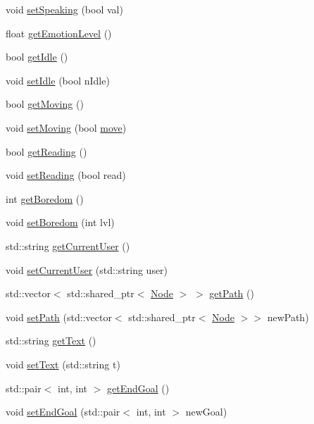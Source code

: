 \begin{DoxyCompactItemize}
void \hyperlink{class_n_p_c_a16d67a6d98c54df2fe320c64c5680285}{set\+Speaking} (bool val)
\item 
float \hyperlink{class_n_p_c_a6ee0944f7b8cdf1ab5ab164b3d7074bc}{get\+Emotion\+Level} ()
\item 
bool \hyperlink{class_n_p_c_a5f19b3b029fd8366921b5bb71335ee9a}{get\+Idle} ()
\item 
void \hyperlink{class_n_p_c_a154d9c6f7c920edcfaeb20f826419ac6}{set\+Idle} (bool n\+Idle)
\item 
bool \hyperlink{class_n_p_c_acb2a20f35f7bb54569032cc1b6a67be0}{get\+Moving} ()
\item 
void \hyperlink{class_n_p_c_af18588e2baa382f12e4e9fe56fc247bc}{set\+Moving} (bool \hyperlink{class_n_p_c_abaa15a4fd5a37a62983d7fd2acafe271}{move})
\item 
bool \hyperlink{class_n_p_c_a723183afdc657db3ec2ef88779e80968}{get\+Reading} ()
\item 
void \hyperlink{class_n_p_c_a9e0ab46138990129c16b78c2a6ee6e25}{set\+Reading} (bool read)
\item 
int \hyperlink{class_n_p_c_a6e50d697a2444e3aff5bfce6252f7bb5}{get\+Boredom} ()
\item 
void \hyperlink{class_n_p_c_a3e24b9fe9d34b635c2f57c48eab0b29d}{set\+Boredom} (int lvl)
\item 
std\+::string \hyperlink{class_n_p_c_a289f4c34cf597a7e61f787844f80a356}{get\+Current\+User} ()
\item 
void \hyperlink{class_n_p_c_a30076f45e31741e86a79f280eca215cb}{set\+Current\+User} (std\+::string user)
\item 
std\+::vector$<$ std\+::shared\+\_\+ptr$<$ \hyperlink{class_node}{Node} $>$ $>$ \hyperlink{class_n_p_c_aa9a219c85034a65f903f38781356b05b}{get\+Path} ()
\item 
void \hyperlink{class_n_p_c_a9582ddb2cc78ad77c8ded77e192be5b0}{set\+Path} (std\+::vector$<$ std\+::shared\+\_\+ptr$<$ \hyperlink{class_node}{Node} $>$$>$ new\+Path)
\item 
std\+::string \hyperlink{class_n_p_c_a480c5ef808977d9d81aef0f9e7b2093f}{get\+Text} ()
\item 
void \hyperlink{class_n_p_c_ae94160d4a1fe8d5195e9ae66f78059ce}{set\+Text} (std\+::string t)
\item 
std\+::pair$<$ int, int $>$ \hyperlink{class_n_p_c_a64a6c85370defc9094cf5e597a7bc85d}{get\+End\+Goal} ()
\item 
void \hyperlink{class_n_p_c_aefc13625a35497cf6158c15692c52eda}{set\+End\+Goal} (std\+::pair$<$ int, int $>$ new\+Goal)
\end{DoxyCompactItemize}
